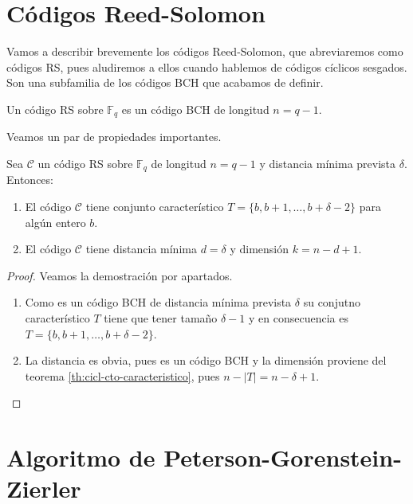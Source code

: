 \section{Códigos Reed-Solomon}

Vamos a describir brevemente los códigos Reed-Solomon, que abreviaremos como códigos RS, pues aludiremos a ellos cuando hablemos de códigos cíclicos sesgados.
Son una subfamilia de los códigos BCH que acabamos de definir.

\begin{definition}
  Un código RS sobre \(\mathbb F_q\) es un código BCH de longitud \(n = q - 1\).
\end{definition}

Veamos un par de propiedades importantes.

\begin{theorem}
  Sea \(\mathcal C\) un código RS sobre \(\mathbb F_q\) de longitud \(n = q - 1\) y distancia mínima prevista \(\delta\).
  Entonces:
  \begin{enumerate}
    \item El código \(\mathcal C\) tiene conjunto característico \(T = \{b, b + 1, \dots, b + \delta - 2\}\) para algún entero \(b\).
    \item El código \(\mathcal C\) tiene distancia mínima \(d = \delta\) y dimensión \(k = n - d + 1\).
  \end{enumerate}
\end{theorem}

\begin{proof}
  Veamos la demostración por apartados.
  \begin{enumerate}
    \item Como es un código BCH de distancia mínima prevista \(\delta\) su conjutno característico \(T\) tiene que tener tamaño \(\delta - 1\) y en consecuencia es \(T = \{b, b + 1, \dots, b + \delta - 2\}\).
    \item La distancia es obvia, pues es un código BCH y la dimensión proviene del teorema \ref{th:cicl-cto-caracteristico}, pues \(n - |T| = n - \delta + 1\).
  \end{enumerate}
\end{proof}


\section{Algoritmo de Peterson-Gorenstein-Zierler}

